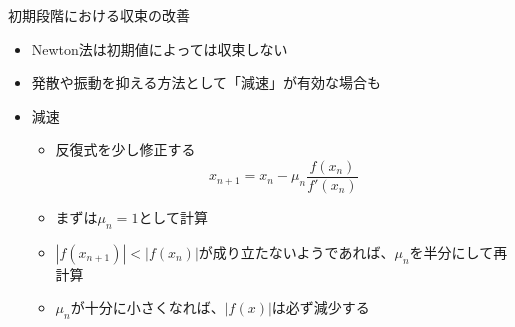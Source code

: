 \begin{frame}[t,fragile]{初期段階における収束の改善}
  \begin{itemize}
  \item Newton法は初期値によっては収束しない
  \item 発散や振動を抑える方法として「減速」が有効な場合も
  \item 減速
    \begin{itemize}
    \item 反復式を少し修正する
      \[
      x_{n+1} = x_n - \mu_n \frac{f(x_n)}{f'(x_n)}
      \]
    \item まずは$\mu_n=1$として計算
    \item $|f(x_{n+1})| < |f(x_{n})|$が成り立たないようであれば、$\mu_n$を半分にして再計算
    \item $\mu_n$が十分に小さくなれば、$|f(x)|$は必ず減少する
    \end{itemize}
  \end{itemize}
\end{frame}
